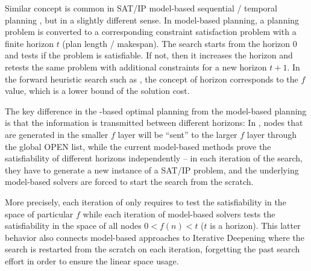 Similar concept is common in SAT/IP model-based sequential / temporal planning
\cite{rintanen2012planning,van2005optiplan}, but in a slightly different sense.  In model-based planning, a
planning problem is converted to a corresponding constraint satisfaction problem with a finite horizon $t$ (plan
length / makespan). The search starts from the horizon 0 and tests if the problem is satisfiable. If not, then it
increases the horizon and retests the same problem with additional constraints for a new horizon $t+1$. In the
forward heuristic search such as \astar, the concept of horizon corresponds to the $f$ value, which is a lower
bound of the solution cost.

The key difference in the \astar-based optimal planning from the model-based planning is
that the information is transmitted between different horizons:
In \astar, nodes that are generated in the smaller
$f$ layer will be ``sent'' to the larger $f$ layer through the global OPEN
list, while the current model-based methods prove the satisfiability of
different horizons independently -- in each iteration of the search,
they have to generate a new instance of a SAT/IP problem, and the
underlying model-based solvers are forced to start the search from the scratch.

More precisely, each iteration of \astar only requires to test the satisfiability in the space of particular
$f$ while each iteration of model-based solvers tests the satisfiability in the space of all nodes $0<f(n)<t$
($t$ is a horizon).  This latter behavior also connects model-based approaches to Iterative Deepening \astar
\cite{korf1985depth} where the search is restarted from the scratch on each iteration, forgetting the past search
effort in order to ensure the linear space usage.
% 
% 

